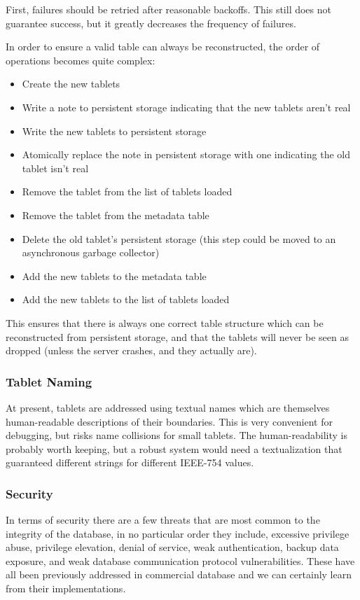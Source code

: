 \documentclass[11pt]{article}
\begin{document}
First, failures should be retried after reasonable backoffs.  This still does not guarantee success, but it greatly decreases the frequency of failures.

In order to ensure a valid table can always be reconstructed, the order of operations becomes quite complex:

\begin{itemize}
\setlength\itemsep{0em}
\item Create the new tablets
\item Write a note to persistent storage indicating that the new tablets aren't real
\item Write the new tablets to persistent storage
\item Atomically replace the note in persistent storage with one indicating the old tablet isn't real
\item Remove the tablet from the list of tablets loaded
\item Remove the tablet from the metadata table
\item Delete the old tablet's persistent storage (this step could be moved to an asynchronous garbage collector)
\item Add the new tablets to the metadata table
\item Add the new tablets to the list of tablets loaded
\end{itemize}

This ensures that there is always one correct table structure which can be reconstructed from persistent storage, and that the tablets will never be seen as dropped (unless the server crashes, and they actually are).

\subsubsection{Tablet Naming}

At present, tablets are addressed using textual names which are themselves human-readable descriptions of their boundaries.  This is very convenient for debugging, but risks name collisions for small tablets.  The human-readability is probably worth keeping, but a robust system would need a textualization that guaranteed different strings for different IEEE-754 values.

\subsubsection{Security}

In terms of security there are a few threats that are most common to the integrity of the database, in no particular order they include, excessive privilege abuse, privilege elevation, denial of service, weak authentication, backup data exposure, and weak database communication protocol vulnerabilities\cite{security}. These have all been previously addressed in commercial database and we can certainly learn from their implementations. 
\end{document}
